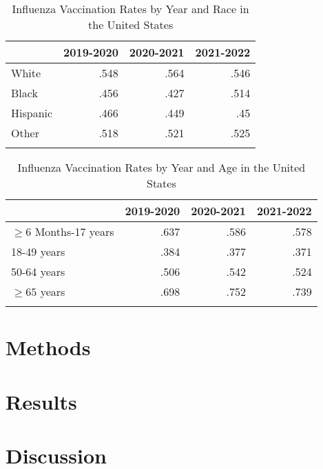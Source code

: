 \documentclass[12pt]{article}
\begin{document}
\begin{table}[h!]
    \centering
    \caption{Influenza Vaccination Rates by Year and Race in the United States}
    \label{tab:table:proporitonsrace}
     \begin{tabularx}{.8\textwidth}{X rrr}
      \lsptoprule
                & 2019-2020 & 2020-2021  & 2021-2022\\
      \midrule
      White  &   .548  &    .564  &    .546\\
      Black  &   .456  &    .427  &    .514\\
      Hispanic  &   .466  &    .449  &   .45\\
      Other  &   .518  &    .521  &    .525\\
      \lspbottomrule
     \end{tabularx}
    \end{table}

\begin{table}[h!]
    \centering
    \caption{Influenza Vaccination Rates by Year and Age in the United States}
    \label{tab:table:proporitonsage}
     \begin{tabularx}{.8\textwidth}{X rrr}
      \lsptoprule
                & 2019-2020 & 2020-2021  & 2021-2022\\
      \midrule
      $\ge6$ Months-17 years  &   .637  &    .586  &    .578\\
      18-49 years  &   .384  &    .377  &    .371\\
      50-64 years &   .506  &    .542  &    .524\\
      $\ge 65$ years  &   .698  &    .752 &   .739\\
      \lspbottomrule
     \end{tabularx}
    \end{table}

\section{Methods}
\label{sec:Methods}

\section{Results}
\label{sec:Results}

\section{Discussion}
\label{sec:Discussion}



\end{document}
